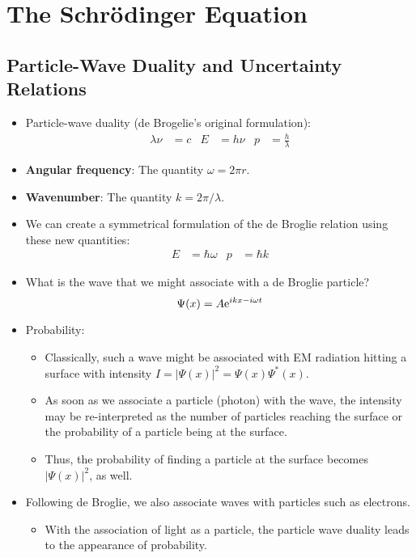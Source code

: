 \documentclass[../notes.tex]{subfiles}
\begin{document}
\chapter{The Schr\"{o}dinger Equation}
\section{Particle-Wave Duality and Uncertainty Relations}
\begin{itemize}
    \item {}Particle-wave duality (de Brogelie's original formulation):
    \begin{align*}
        \lambda\nu &= c&
        E &= h\nu&
        p &= \frac{h}{\lambda}
    \end{align*}
    \item \textbf{Angular frequency}: The quantity $\omega=2\pi r$.
    \item \textbf{Wavenumber}: The quantity $k=2\pi/\lambda$.
    \item We can create a symmetrical formulation of the de Broglie relation using these new quantities:
    \begin{align*}
        E &= \hbar\omega&
        p &= \hbar k
    \end{align*}
    \item What is the wave that we might associate with a de Broglie particle?
    \begin{equation*}
        \Psi(x) = A\e[ikx-i\omega t]
    \end{equation*}
    \item Probability:
    \begin{itemize}
        \item Classically, such a wave might be associated with EM radiation hitting a surface with intensity $I=|\Psi(x)|^2=\Psi(x)\Psi^*(x)$.
        \item As soon as we associate a particle (photon) with the wave, the intensity may be re-interpreted as the number of particles reaching the surface or the probability of a particle being at the surface.
        \item Thus, the probability of finding a particle at the surface becomes $|\Psi(x)|^2$, as well.
    \end{itemize}
    \item Following de Broglie, we also associate waves with particles such as electrons.
    \begin{itemize}
        \item With the association of light as a particle, the particle wave duality leads to the appearance of probability.

\end{itemize}
\end{itemize}
\end{document}
